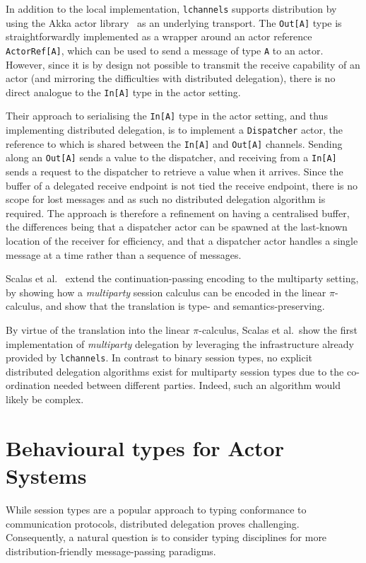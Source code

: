 \documentclass[
graybox,
envcountchap
]{svmult}
\begin{document}
\begin{bibunit}
  In addition to the local implementation, \texttt{lchannels} supports distribution
  by using the Akka actor library~\cite{akka} as an underlying transport.
  The \verb+Out[A]+ type is straightforwardly implemented as a wrapper around an
  actor reference \verb+ActorRef[A]+, which can be used to send a message of
  type \verb+A+ to an actor. However, since it is by design not possible to
  transmit the receive capability of an actor (and mirroring the difficulties
  with distributed delegation), there is no direct analogue to the \verb+In[A]+
  type in the actor setting.

  Their approach to serialising the \verb+In[A]+ type in the actor setting, and
  thus implementing distributed delegation, is to implement a \verb+Dispatcher+
  actor, the reference to which is shared between the \verb+In[A]+ and
  \verb+Out[A]+ channels. Sending along an \verb+Out[A]+ sends a value to the
  dispatcher, and receiving from a \verb+In[A]+ sends a request to the
  dispatcher to retrieve a value when it arrives. Since the buffer of a delegated
  receive endpoint is not tied the receive endpoint, there is no scope for
  lost messages and as such no distributed delegation algorithm is required.
  The approach is therefore a refinement on having a centralised buffer, the
  differences being that a dispatcher actor can be spawned at the last-known
  location of the receiver for efficiency, and that a dispatcher actor handles a
  single message at a time rather than a sequence of messages.

  Scalas et al.~\cite{ScalasDHY17:mpst-decomposition} extend the
  continuation-passing encoding to the multiparty setting, by showing how a
  \emph{multiparty} session calculus can be encoded in the linear
  $\pi$-calculus, and show that the translation is type- and
  semantics-preserving.

  By virtue of the translation into the linear $\pi$-calculus, Scalas et al.\
  show the first implementation of \emph{multiparty} delegation by leveraging
  the infrastructure already provided by \texttt{lchannels}. In contrast to
  binary session types, no explicit distributed delegation algorithms exist for
  multiparty session types due to the co-ordination needed between different
  parties. Indeed, such an algorithm would likely be complex.

  \section{Behavioural types for Actor Systems}\label{sec:bt:actor-types}
  While session types are a popular approach to typing conformance to
  communication protocols, distributed delegation proves challenging.
  Consequently, a natural question is to consider typing disciplines for more
  distribution-friendly message-passing paradigms.


\end{bibunit}
\end{document}
